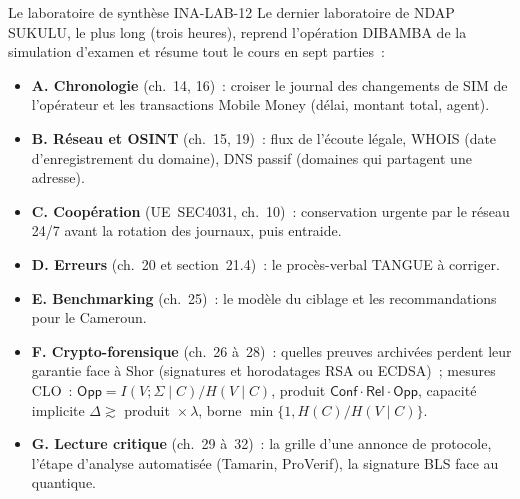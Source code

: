 \separateur

\begin{boiteRemarque}{Le laboratoire de synthèse INA-LAB-12}
Le dernier laboratoire de NDAP SUKULU, le plus long (trois heures), reprend
l'opération DIBAMBA de la simulation d'examen et résume tout le cours en sept
parties~:
\begin{itemize}
    \item \textbf{A. Chronologie} (ch.~14, 16)~: croiser le journal des
          changements de SIM de l'opérateur et les transactions Mobile Money
          (délai, montant total, agent).
    \item \textbf{B. Réseau et OSINT} (ch.~15, 19)~: flux de l'écoute légale,
          WHOIS (date d'enregistrement du domaine), DNS passif (domaines qui
          partagent une adresse).
    \item \textbf{C. Coopération} (UE~SEC4031, ch.~10)~: conservation urgente
          par le réseau 24/7 avant la rotation des journaux, puis entraide.
    \item \textbf{D. Erreurs} (ch.~20 et section~21.4)~: le procès-verbal TANGUE
          à corriger.
    \item \textbf{E. Benchmarking} (ch.~25)~: le modèle du ciblage et les
          recommandations pour le Cameroun.
    \item \textbf{F. Crypto-forensique} (ch.~26 à~28)~: quelles preuves
          archivées perdent leur garantie face à Shor (signatures et horodatages
          RSA ou ECDSA)~; mesures CLO~: $\mathsf{Opp}=I(V;\Sigma\mid C)/H(V\mid C)$,
          produit $\mathsf{Conf}\cdot\mathsf{Rel}\cdot\mathsf{Opp}$, capacité
          implicite $\Delta \gtrsim$ produit~$\times\,\lambda$, borne
          $\min\{1, H(C)/H(V\mid C)\}$.
    \item \textbf{G. Lecture critique} (ch.~29 à~32)~: la grille d'une annonce de
          protocole, l'étape d'analyse automatisée (Tamarin, ProVerif), la
          signature BLS face au quantique.
\end{itemize}
\end{boiteRemarque}

